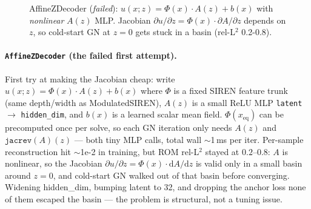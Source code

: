 \begin{figure}[H]
  \centering
  \caption*{\small AffineZDecoder (\emph{failed}): $u(x{;}z) = \Phi(x)\cdot A(z) + b(x)$ with \emph{nonlinear} $A(z)$ MLP. Jacobian $\partial u/\partial z = \Phi(x)\cdot \partial A/\partial z$ depends on $z$, so cold-start GN at $z{=}0$ gets stuck in a basin (rel-L$^2$ 0.2-0.8).}
\end{figure}

\paragraph{\texttt{AffineZDecoder} (the failed first attempt).}
First try at making the Jacobian cheap: write
$u(x;z) = \Phi(x) \cdot A(z) + b(x)$ where $\Phi$ is a fixed SIREN
feature trunk (same depth/width as ModulatedSIREN), $A(z)$ is a small
ReLU MLP \texttt{latent} $\to$ \texttt{hidden\_dim}, and $b(x)$ is a
learned scalar mean field. $\Phi(x_{\text{eq}})$ can be precomputed
once per solve, so each GN iteration only needs $A(z)$ and
$\mathtt{jacrev}(A)(z)$ --- both tiny MLP calls, total wall $\sim$1\,ms
per iter. Per-sample reconstruction hit $\sim$1e-2 in training, but
ROM rel-L$^2$ stayed at $0.2$--$0.8$: $A$ is nonlinear, so the
Jacobian $\partial u / \partial z = \Phi(x) \cdot \mathrm{d}A/\mathrm{d}z$
is valid only in a small basin around $z{=}0$, and cold-start GN
walked out of that basin before converging. Widening hidden\_dim,
bumping latent to 32, and dropping the anchor loss none of them
escaped the basin --- the problem is structural, not a tuning issue.

